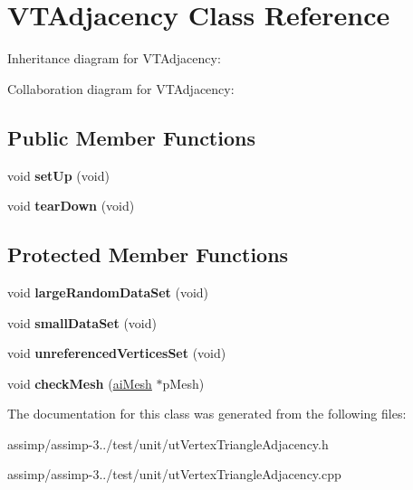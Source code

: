\hypertarget{class_v_t_adjacency}{\section{V\+T\+Adjacency Class Reference}
\label{class_v_t_adjacency}
}


Inheritance diagram for V\+T\+Adjacency\+:


Collaboration diagram for V\+T\+Adjacency\+:
\subsection*{Public Member Functions}
\begin{DoxyCompactItemize}
\item 
\hypertarget{class_v_t_adjacency_ac57b498c411183bc4319844841a73f0c}{void {\bfseries set\+Up} (void)}\label{class_v_t_adjacency_ac57b498c411183bc4319844841a73f0c}

\item 
\hypertarget{class_v_t_adjacency_aa0821db88d21d6bf47089149045c07ae}{void {\bfseries tear\+Down} (void)}\label{class_v_t_adjacency_aa0821db88d21d6bf47089149045c07ae}

\end{DoxyCompactItemize}
\subsection*{Protected Member Functions}
\begin{DoxyCompactItemize}
\item 
\hypertarget{class_v_t_adjacency_aaccc8b94a5583b70e43b6f2f0088f364}{void {\bfseries large\+Random\+Data\+Set} (void)}\label{class_v_t_adjacency_aaccc8b94a5583b70e43b6f2f0088f364}

\item 
\hypertarget{class_v_t_adjacency_a92112f8b2feb5185f0e95276fa07f49b}{void {\bfseries small\+Data\+Set} (void)}\label{class_v_t_adjacency_a92112f8b2feb5185f0e95276fa07f49b}

\item 
\hypertarget{class_v_t_adjacency_ae875621117fa723e934c225a8c8abf55}{void {\bfseries unreferenced\+Vertices\+Set} (void)}\label{class_v_t_adjacency_ae875621117fa723e934c225a8c8abf55}

\item 
\hypertarget{class_v_t_adjacency_afa56d6e8c0a87081d967c6e9c392eba7}{void {\bfseries check\+Mesh} (\hyperlink{structai_mesh}{ai\+Mesh} $\ast$p\+Mesh)}\label{class_v_t_adjacency_afa56d6e8c0a87081d967c6e9c392eba7}

\end{DoxyCompactItemize}


The documentation for this class was generated from the following files\+:\begin{DoxyCompactItemize}
\item 
assimp/assimp-\/3../test/unit/ut\+Vertex\+Triangle\+Adjacency.\+h\item 
assimp/assimp-\/3../test/unit/ut\+Vertex\+Triangle\+Adjacency.\+cpp\end{DoxyCompactItemize}
